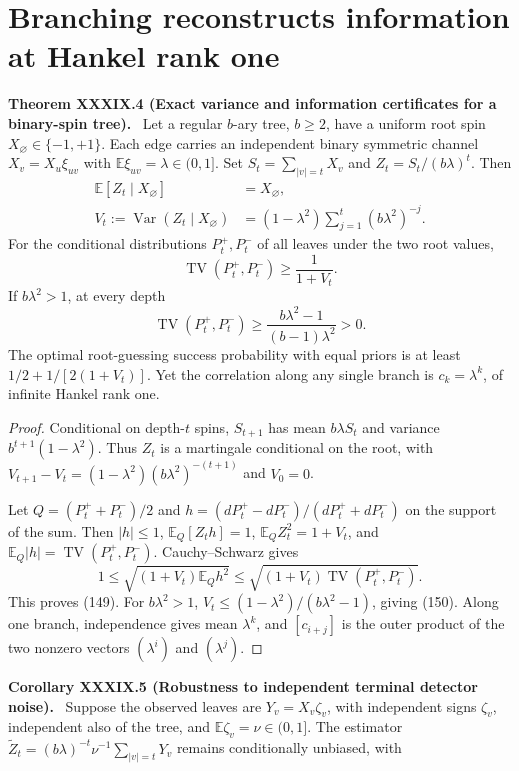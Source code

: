 \documentclass[11pt,a4paper,oneside]{book}
\newcommand{\statement}[3]{\par\medskip\noindent\textbf{#1 #2 (#3).}\ }
\begin{document}
\section{Branching reconstructs information at Hankel rank one}
\statement{Theorem}{XXXIX.4}{Exact variance and information certificates for a binary-spin tree}
Let a regular $b$-ary tree, $b\ge2$, have a uniform root spin $X_\varnothing\in\{-1,+1\}$. Each edge carries an independent binary symmetric channel $X_v=X_u\xi_{uv}$ with $\mathbb E\xi_{uv}=\lambda\in(0,1]$. Set $S_t=\sum_{|v|=t}X_v$ and $Z_t=S_t/(b\lambda)^t$. Then
\begin{align}\mathbb E[Z_t\mid X_\varnothing]&=X_\varnothing,\tag{147}\\V_t:=\operatorname{Var}(Z_t\mid X_\varnothing)&=(1-\lambda^2)\sum_{j=1}^t(b\lambda^2)^{-j}.\tag{148}\end{align}
For the conditional distributions $P_t^+,P_t^-$ of all leaves under the two root values,
\begin{equation}\operatorname{TV}(P_t^+,P_t^-)\ge\frac1{1+V_t}.\tag{149}\end{equation}
If $b\lambda^2>1$, at every depth
\begin{equation}\operatorname{TV}(P_t^+,P_t^-)\ge\frac{b\lambda^2-1}{(b-1)\lambda^2}>0.\tag{150}\end{equation}
The optimal root-guessing success probability with equal priors is at least $1/2+1/[2(1+V_t)]$. Yet the correlation along any single branch is $c_k=\lambda^k$, of infinite Hankel rank one.
\begin{proof}
Conditional on depth-$t$ spins, $S_{t+1}$ has mean $b\lambda S_t$ and variance $b^{t+1}(1-\lambda^2)$. Thus $Z_t$ is a martingale conditional on the root, with $V_{t+1}-V_t=(1-\lambda^2)(b\lambda^2)^{-(t+1)}$ and $V_0=0$.

Let $Q=(P_t^++P_t^-)/2$ and $h=(dP_t^+-dP_t^-)/(dP_t^++dP_t^-)$ on the support of the sum. Then $|h|\le1$, $\mathbb E_Q[Z_th]=1$, $\mathbb E_QZ_t^2=1+V_t$, and $\mathbb E_Q|h|=\operatorname{TV}(P_t^+,P_t^-)$. Cauchy--Schwarz gives
\[1\le\sqrt{(1+V_t)\mathbb E_Qh^2}\le\sqrt{(1+V_t)\operatorname{TV}(P_t^+,P_t^-)}.\]
This proves (149). For $b\lambda^2>1$, $V_t\le(1-\lambda^2)/(b\lambda^2-1)$, giving (150). Along one branch, independence gives mean $\lambda^k$, and $[c_{i+j}]$ is the outer product of the two nonzero vectors $(\lambda^i)$ and $(\lambda^j)$.
\end{proof}
\statement{Corollary}{XXXIX.5}{Robustness to independent terminal detector noise}
Suppose the observed leaves are $Y_v=X_v\zeta_v$, with independent signs $\zeta_v$, independent also of the tree, and $\mathbb E\zeta_v=\nu\in(0,1]$. The estimator $\widetilde Z_t=(b\lambda)^{-t}\nu^{-1}\sum_{|v|=t}Y_v$ remains conditionally unbiased, with
\end{document}
